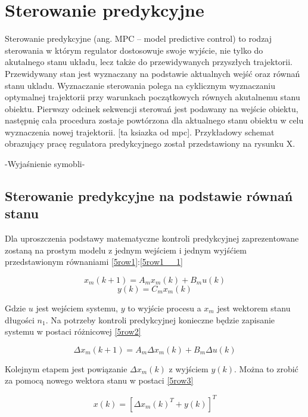 \chapter{Sterowanie predykcyjne}
\label{cha:MPC}
Sterowanie predykcyjne (ang. MPC – model predictive control) to rodzaj sterowania w którym regulator dostosowuje swoje wyjście, nie tylko do akutalnego stanu układu, lecz także do 
przewidywanych przyszłych trajektorii. Przewidywany stan jest wyznaczany na podstawie aktualnych wejść oraz równań stanu ukladu. Wyznaczanie sterowania polega na cyklicznym wyznaczaniu optymalnej trajektorii przy warunkach początkowych równych akutalnemu stanu obiektu. Pierwszy odcinek sekwencji sterowań jest podawany na wejście obiektu, następnię cała procedura zostaje powtórzona dla aktualnego stanu obiektu w celu wyznaczenia nowej trajektorii. [ta ksiazka od mpc]. Przykładowy schemat obrazujący pracę regulatora predykcyjnego został przedstawiony na rysunku X.

-Wyjaśnienie symobli-

\section{Sterowanie predykcyjne na podstawie równań stanu}
\label{mpc_ss}

Dla uproszczenia podstawy matematyczne kontroli predykcyjnej zaprezentowane zostaną na prostym modelu z jednym wejściem i jednym wyjśćiem przedstawionym równaniami \ref{5row1}:\ref{5row1__1}

\begin{equation}
\label{5row1} 
x_m(k+1)=A_mx_m(k)+B_mu(k)
\end{equation}
\begin{equation}
\label{5row1__1} 
y(k)=C_mx_m(k)
\end{equation}

Gdzie $u$ jest wejściem systemu, $y$ to wyjście procesu a $x_m$ jest wektorem stanu długości $n_1$. Na potrzeby kontroli predykcyjnej konieczne będzie zapisanie systemu w postaci różnicowej \ref{5row2}

\begin{equation}
\label{5row2} 
\Delta x_m(k+1)=A_m\Delta x_m(k)+B_m\Delta u(k)
\end{equation}

Kolejnym etapem jest powiązanie $\Delta x_m(k)$ z wyjściem $y(k)$. Można to zrobić za pomocą nowego wektora stanu w postaci \ref{5row3}

\begin{equation}
\label{5row3} 
x(k)=[\Delta x_m(k)^T+y(k)]^T
\end{equation}

